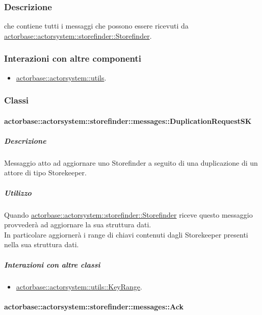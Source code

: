 \documentclass{scalatekids-article}
\begin{document}
\subsubsection{Descrizione}

 che contiene tutti i messaggi che possono essere ricevuti da
\hyperref[sec:actorbase::actorsystem::storefinder::Storefinder]{actorbase::actorsystem::storefinder::Storefinder}.

\subsubsection{Interazioni con altre componenti}
\begin{itemize}
\item \hyperref[sec:actorbase::actorsystem::utils]{actorbase::actorsystem::utils}.
\end{itemize}


\subsubsection{Classi}

\paragraph{actorbase::actorsystem::storefinder::messages::DuplicationRequestSK}
\label{sec:actorbase::actorsystem::storefinder::messages::DuplicationRequestSK}

\subparagraph{Descrizione}
Messaggio atto ad aggiornare uno Storefinder a seguito di una duplicazione
di un attore di tipo Storekeeper.\\

\subparagraph{Utilizzo}
Quando \hyperref[sec:actorbase::actorsystem::storefinder::Storefinder]{actorbase::\allowbreak{}actorsystem::\allowbreak{}storefinder::\allowbreak{}Storefinder}
riceve questo messaggio provvederà ad aggiornare la sua struttura dati.\\In
particolare aggiornerà i range di chiavi contenuti dagli Storekeeper presenti
nella sua struttura dati.

\subparagraph{Interazioni con altre classi}
\begin{itemize}
\item \hyperref[sec:actorbase::actorsystem::utils::KeyRange]{actorbase::actorsystem::utils::KeyRange}.
\end{itemize}

\paragraph{actorbase::actorsystem::storefinder::messages::Ack}
\label{sec:actorbase::actorsystem::storefinder::messages::Ack}
\end{document}

